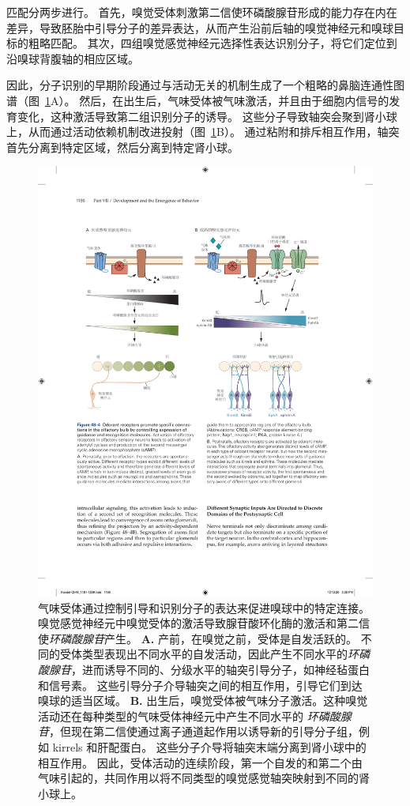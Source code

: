 匹配分两步进行。
首先，嗅觉受体刺激第二信使环磷酸腺苷形成的能力存在内在差异，导致胚胎中引导分子的差异表达，从而产生沿前后轴的嗅觉神经元和嗅球目标的粗略匹配。
其次，四组嗅觉感觉神经元选择性表达识别分子，将它们定位到沿嗅球背腹轴的相应区域。


因此，分子识别的早期阶段通过与活动无关的机制生成了一个粗略的鼻脑连通性图谱（图~\ref{fig:48_4}A）。
然后，在出生后，气味受体被气味激活，并且由于细胞内信号的发育变化，这种激活导致第二组识别分子的诱导。
这些分子导致轴突会聚到肾小球上，从而通过活动依赖机制改进投射（图~\ref{fig:48_4}B）。
通过粘附和排斥相互作用，轴突首先分离到特定区域，然后分离到特定肾小球。


\begin{figure}[htbp]
	\centering
	\includegraphics[width=0.9\linewidth]{chap48/fig_48_4}
	\caption{气味受体通过控制引导和识别分子的表达来促进嗅球中的特定连接。
		嗅觉感觉神经元中嗅觉受体的激活导致腺苷酸环化酶的激活和第二信使\textit{环磷酸腺苷}产生。
		\textbf{A.} 产前，在嗅觉之前，受体是自发活跃的。
		不同的受体类型表现出不同水平的自发活动，因此产生不同水平的\textit{环磷酸腺苷}，进而诱导不同的、分级水平的轴突引导分子，如神经毡蛋白和信号素。
		这些引导分子介导轴突之间的相互作用，引导它们到达嗅球的适当区域。
		\textbf{B.} 出生后，嗅觉受体被气味分子激活。这种嗅觉活动还在每种类型的气味受体神经元中产生不同水平的 \textit{环磷酸腺苷}，但现在第二信使通过离子通道起作用以诱导新的引导分子组，例如 kirrels 和肝配蛋白。
		这些分子介导将轴突末端分离到肾小球中的相互作用。
		因此，受体活动的连续阶段，第一个自发的和第二个由气味引起的，共同作用以将不同类型的嗅觉感觉轴突映射到不同的肾小球上。}
	\label{fig:48_4}
\end{figure}



